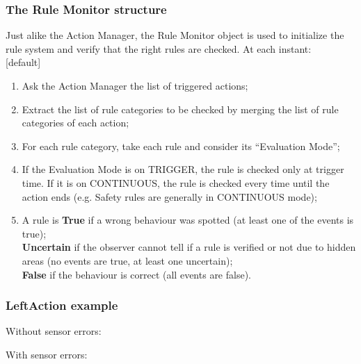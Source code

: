 \documentclass{beamer}
\begin{document}
\begin{frame}

\frametitle{The Rule Monitor structure}
Just alike the Action Manager, the Rule Monitor object is used to initialize
the rule system and verify that the right rules are checked. At each instant:\\

[default]
\begin{enumerate}
\item<+-> Ask the Action Manager the list of triggered actions;\\ 
\item<+-> Extract the list of rule categories to be checked by merging the
	list of rule categories of each action;
\item<+-> For each rule category, take each rule and consider its ``Evaluation Mode'';
\item<+-> If the Evaluation Mode is on TRIGGER, the rule is checked only at trigger time. If it is on CONTINUOUS, the rule is checked every time until the action ends (e.g. Safety rules are generally in CONTINUOUS mode);
\item<+-> A rule is \textbf{True} if a wrong behaviour was spotted (at least one of the events is true);\\
\textbf{Uncertain} if the observer cannot tell 
if a rule is verified or not due to hidden areas (no events are true, at least one uncertain);\\
\textbf{False} if the behaviour is correct  (all events are false).
\end{enumerate}
\end{frame}

\begin{frame}
\frametitle{LeftAction example}

Without sensor errors:\\

\bigskip
\bigskip

With sensor errors:\\

\end{frame}
\end{document}
